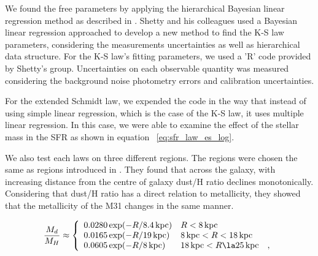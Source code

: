 \documentclass[useAMS,usenatbib]{mn2e}
\newcommand \kpc        {\,{\rm kpc}}
\begin{document}
We found the free parameters by applying the hierarchical Bayesian linear regression method as described in \cite{Shetty13}. Shetty and his colleagues used a Bayesian linear regression approached to develop a new method to find the K-S law parameters, considering the measurements uncertainties as well as hierarchical data structure. For the K-S law's fitting parameters, we used a 'R' code provided by Shetty's group. Uncertainties on each observable quantity was measured considering the background noise photometry errors and calibration uncertainties.%
 
For the extended Schmidt law, we expended the code in the way that instead of using simple linear regression, which is the case of the K-S law, it uses multiple linear regression. In this case, we were able to examine the effect of the stellar mass in the SFR as shown in equation ~\ref{eq:sfr_law_es_log}.

We also test each laws on three different regions. The regions were chosen the same as regions introduced in \cite{Draine14}. They found that across the galaxy, with increasing distance from the centre of galaxy dust/H ratio declines monotonically. Considering that dust/H ratio has a direct relation to metallicity, they showed that the metallicity of the M31 changes in the same manner.

\begin{equation}
\label{eq:dust2gas_vs_R}
\frac{M_d}{M_H} \approx
\left\{ \begin{array}{l l}
0.0280 \exp(-R/8.4\kpc)  & R< 8\kpc\\
0.0165 \exp(-R/19\kpc)   & 8\kpc < R < 18\kpc\\
0.0605 \exp(-R/8\kpc)    & 18\kpc < R \la 25\kpc ~~~,\\
\end{array}
\right.
\end{equation}
\end{document}
